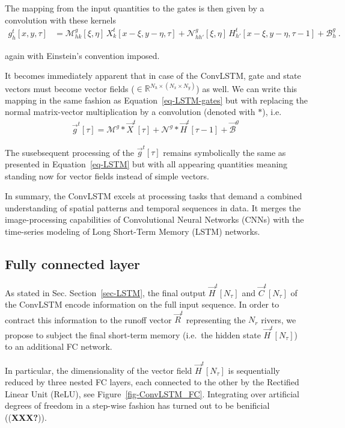\documentclass[
]{agujournal2019}
\begin{document}
The mapping from the input quantities to the gates is then given by a
convolution with these kernels \[
\begin{aligned}
g^t_h[x,y,\tau] & =  \mathcal{M}^{g}_{hk} [\xi,\eta]\, X^t_k[x-\xi, y-\eta, \tau]  +  \mathcal{N}^{g}_{hh'}[\xi,\eta] \, H^t_{h'}[x-\xi, y-\eta, \tau-1] + \mathcal{B}^g_{h}\ .
\end{aligned}
\]

again with Einstein's convention imposed.

It becomes immediately apparent that in case of the ConvLSTM, gate and
state vectors must become vector fields
(\(\in \mathbb{R}^{N_h \times (N_x \times N_y)}\)) as well. We can write
this mapping in the same fashion as Equation~\ref{eq-LSTM-gates} but
with replacing the normal matrix-vector multiplication by a convolution
(denoted with \(\ast\)), i.e.\\
\[
\begin{aligned}
\vec{g}^t[\tau] = \pmb{\mathcal{M}}^{g} \ast \vec{X}^t[\tau] + \pmb{\mathcal{N}}^{g} \ast  \vec{H}^t[ \tau-1]+ \vec{\mathcal{B}}^g \,
\end{aligned}
\]

The susebsequent processing of the \(\vec{g}^t[\tau]\) remains
symbolically the same as presented in Equation~\ref{eq-LSTM} but with
all appearing quantities meaning standing now for vector fields instead
of simple vectors.

In summary, the ConvLSTM excels at processing tasks that demand a
combined understanding of spatial patterns and temporal sequences in
data. It merges the image-processing capabilities of Convolutional
Neural Networks (CNNs) with the time-series modeling of Long Short-Term
Memory (LSTM) networks.

\subsection{Fully connected layer}\label{sec-FC_layer}

As stated in Sec. Section~\ref{sec-LSTM}, the final output
\(\vec{H}^t[N_\tau]\) and \(\vec{C}^t[N_\tau]\) of the ConvLSTM encode
information on the full input sequence. In order to contract this
information to the runoff vector \(\vec{R}^t\) representing the \(N_r\)
rivers, we propose to subject the final short-term memory (i.e.~the
hidden state \(\vec{H}^t[N_\tau]\)) to an additional FC network.

In particular, the dimensionality of the vector field
\(\vec{H}^t[N_\tau]\) is sequentially reduced by three nested FC layers,
each connected to the other by the Rectified Linear Unit (ReLU), see
Figure~\ref{fig-ConvLSTM_FC}. Integrating over artificial degrees of
freedom in a step-wise fashion has turned out to be benificial
((\textbf{XXX?})).
\end{document}
